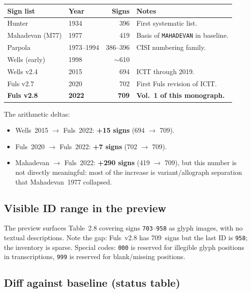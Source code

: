 \documentclass[12pt, a4paper]{article}
\newcommand{\sigid}[1]{\texttt{#1}}
\newcommand{\db}[1]{\texttt{#1}}
\begin{document}
\begin{center}
\small
\renewcommand{\arraystretch}{1.15}
\begin{tabular}{@{}l l r l@{}}
\toprule
\textbf{Sign list} & \textbf{Year} & \textbf{Signs} & \textbf{Notes}\\
\midrule
Hunter            & 1934 & 396 & First systematic list.\\
Mahadevan (M77)   & 1977 & 419 & Basis of \db{MAHADEVAN} in baseline.\\
Parpola           & 1973--1994 & 386--396 & CISI numbering family.\\
Wells (early)     & 1998 & $\sim$610 & \\
Wells v2.4        & 2015 & 694 & ICIT through 2019.\\
Fuls v2.7         & 2020 & 702 & First Fuls revision of ICIT.\\
\textbf{Fuls v2.8} & \textbf{2022} & \textbf{709} & \textbf{Vol.~1 of this monograph.}\\
\bottomrule
\end{tabular}
\end{center}

The arithmetic deltas:
\begin{itemize}[leftmargin=1.6em, itemsep=2pt]
\item Wells~2015 $\rightarrow$ Fuls~2022: \textbf{+15 signs}
      (694 $\rightarrow$ 709).
\item Fuls~2020 $\rightarrow$ Fuls~2022: \textbf{+7 signs}
      (702 $\rightarrow$ 709).
\item Mahadevan $\rightarrow$ Fuls~2022: \textbf{+290 signs}
      (419 $\rightarrow$ 709), but this number is not directly
      meaningful: most of the increase is variant/allograph
      separation that Mahadevan~1977 collapsed.
\end{itemize}

\subsection{Visible ID range in the preview}

The preview surfaces Table~2.8 covering signs
\sigid{703}--\sigid{958} as glyph images, with no textual
descriptions.  Note the gap: Fuls~v2.8 has 709~signs but the
last ID is \sigid{958}; the inventory is sparse.  Special
codes: \sigid{000} is reserved for illegible glyph positions
in transcriptions, \sigid{999} is reserved for blank/missing
positions.

\subsection{Diff against baseline (status table)}
\end{document}
